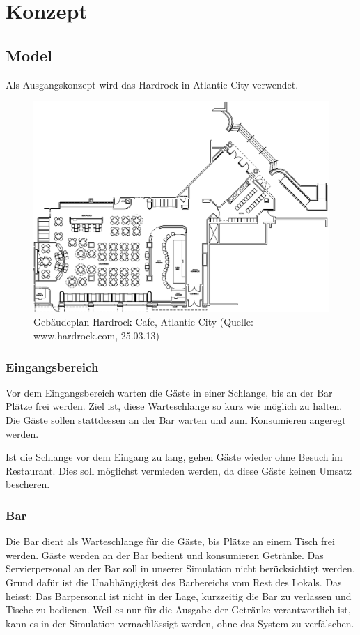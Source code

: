 \documentclass[ngerman,a4paper,12pt]{scrreprt}
\begin{document}
\tableofcontents


\chapter{Konzept}


\section{Model}
Als Ausgangskonzept wird das Hardrock in Atlantic City verwendet.
\begin{figure}[htp]
	\centering
		\includegraphics[width=1\textwidth]{img/hardrock-plan.png}
		\caption[Gebäudeplan Hardrock]{Gebäudeplan Hardrock Cafe, Atlantic City (Quelle: www.hardrock.com, 25.03.13)}
		\label{planHardrock}
\end{figure}

\subsection{Eingangsbereich}
Vor dem Eingangsbereich warten die Gäste in einer Schlange, bis an der Bar Plätze frei werden. Ziel ist, diese Warteschlange so kurz wie möglich zu halten. Die Gäste sollen stattdessen an der Bar warten und zum Konsumieren angeregt werden.

Ist die Schlange vor dem Eingang zu lang, gehen Gäste wieder ohne Besuch im Restaurant. Dies soll möglichst vermieden werden, da diese Gäste keinen Umsatz bescheren.

\subsection{Bar}
Die Bar dient als Warteschlange für die Gäste, bis Plätze an einem Tisch frei werden. Gäste werden an der Bar bedient und konsumieren Getränke.
Das Servierpersonal an der Bar soll in unserer Simulation nicht berücksichtigt werden. Grund dafür ist die Unabhängigkeit des Barbereichs vom Rest des Lokals. Das heisst: Das Barpersonal ist nicht in der Lage, kurzzeitig die Bar zu verlassen und Tische zu bedienen. Weil es nur für die Ausgabe der Getränke verantwortlich ist, kann es in der Simulation vernachlässigt werden, ohne das System zu verfälschen.
\end{document}
